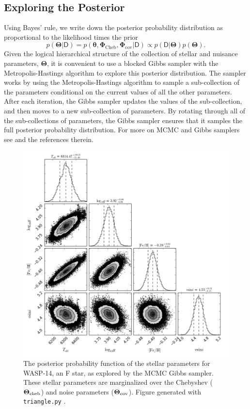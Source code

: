 \documentclass[iop,floatfix]{emulateapj}
\newcommand{\vt}{ {\bm \theta}}
\newcommand{\vT}{ {\bm \Theta}}
\newcommand{\vD}{\mathsf{D}}
\newcommand{\vt}{ {\bm \theta}}
\newcommand{\vT}{ {\bm \Theta}}
\newcommand{\vP}{ {\bm \Phi}}
\newcommand{\stellarParameters}{\vt}
\newcommand{\Cheb}{ \vP_{\textrm{Cheb}}}
\newcommand{\Cov}{ \vP_{\textrm{cov}}}
\newcommand{\allParameters}{\vT} %
\begin{document}
\subsection{Exploring the Posterior }
\label{subsec:MCMC}

Using Bayes' rule, we write down the posterior probability distribution as proportional to the likelihood times the prior
\begin{equation}
  p(\allParameters | \vD) =  p(\stellarParameters, \Cheb, \Cov | \vD ) \propto p(\vD | \allParameters) p(\allParameters).
\end{equation}
Given the logical hierarchical structure of the collection of stellar and nuisance parameters, $\allParameters$, it is convenient to use a blocked Gibbs sampler with the Metropolis-Hastings algorithm to explore this posterior distribution. The sampler works by using the Metropolis-Hastings algorithm to sample a sub-collection of the parameters conditional on the current values of all the other parameters. After each iteration, the Gibbs sampler updates the values of the sub-collection, and then moves to a new sub-collection of parameters. By rotating through all of the sub-collections of parameters, the Gibbs sampler ensures that it samples the full posterior probability distribution. For more on MCMC and Gibbs samplers see \citet[Ch. 11]{gelman13} and the references therein. 

\begin{figure}[!htb]
\begin{center}
  \includegraphics[width=5in]{figs/stellar_triangle_Kurucz.png}
  \caption{The posterior probability function of the stellar parameters for WASP-14, an F star, as explored by the MCMC Gibbs sampler. These stellar parameters are marginalized over the Chebyshev ($\vT_{\rm cheb}$) and noise parameters ($\vT_{\rm cov}$). Figure generated with \texttt{triangle.py} \citep{foreman-mackey14}.
}
\label{fig:stellar_posterior}
\end{center}
\end{figure}
\end{document}
